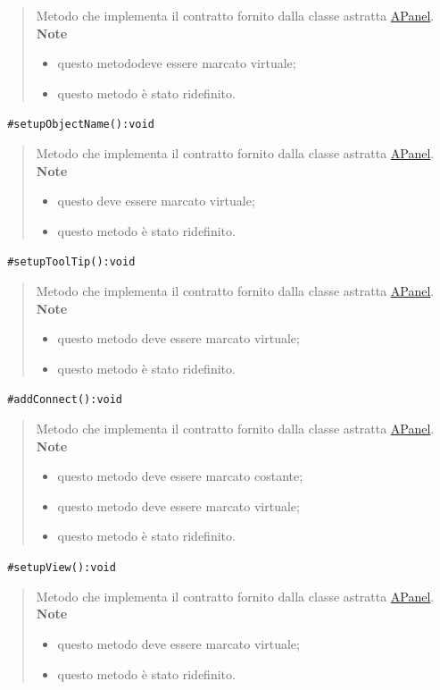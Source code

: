 \begin{quote}
\color{black} Metodo che implementa il contratto fornito dalla classe astratta \hyperref[speAPanel]{APanel}.\\
 \textbf{Note}
 \begin{itemize}
  \item questo metododeve essere marcato virtuale;
 \item questo metodo è stato ridefinito.
 \end{itemize}
\end{quote} 
\color{blue}\verb! #setupObjectName():void!
\begin{quote}
\color{black}Metodo che implementa il contratto fornito dalla classe astratta \hyperref[speAPanel]{APanel}.\\
 \textbf{Note}
 \begin{itemize}
  \item questo deve essere marcato virtuale;
 \item questo metodo è stato ridefinito.
 \end{itemize}
\end{quote} 
\color{blue}\verb! #setupToolTip():void!
\begin{quote}
\color{black}Metodo che implementa il contratto fornito dalla classe astratta \hyperref[speAPanel]{APanel}.\\
 \textbf{Note}
 \begin{itemize}
 \item questo metodo deve essere marcato virtuale;
 \item questo metodo è stato ridefinito.
 \end{itemize}
\end{quote} 
\color{blue}\verb! #addConnect():void!
\begin{quote}
\color{black}Metodo che implementa il contratto fornito dalla classe astratta \hyperref[speAPanel]{APanel}.\\
 \textbf{Note}
 \begin{itemize}
 \item questo metodo deve essere marcato costante;
 \item questo metodo deve essere marcato virtuale;
 \item questo metodo è stato ridefinito.
 \end{itemize}
\end{quote} 
\color{blue}\verb! #setupView():void!
\begin{quote}
\color{black}Metodo che implementa il contratto fornito dalla classe astratta \hyperref[speAPanel]{APanel}.\\
 \textbf{Note}
 \begin{itemize}
 \item questo metodo deve essere marcato virtuale;
 \item questo metodo è stato ridefinito.
 \end{itemize}
\end{quote}
